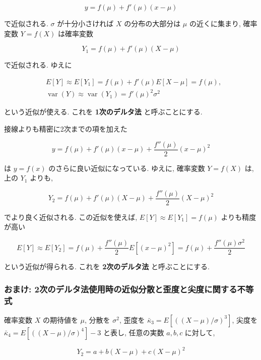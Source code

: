 \documentclass[
  letterpaper,
  DIV=11,
  numbers=noendperiod]{scrartcl}
\begin{document}
\[
y = f(\mu) + f'(\mu)(x - \mu)
\]

で近似される. \(\sigma\) が十分小さければ \(X\) の分布の大部分は \(\mu\)
の近くに集まり, 確率変数 \(Y = f(X)\) は確率変数

\[
Y_1 = f(\mu) + f'(\mu)(X - \mu)
\]

で近似される. ゆえに

\[
\begin{aligned}
&
E[Y] \approx E[Y_1] = f(\mu) + f'(\mu)E[X - \mu] = f(\mu),
\\ &
\operatorname{var}(Y) \approx \operatorname{var}(Y_1) = f'(\mu)^2\sigma^2
\end{aligned}
\]

という近似が使える. これを \textbf{1次のデルタ法} と呼ぶことにする.

接線よりも精密に2次までの項を加えた

\[
y = f(\mu) + f'(\mu)(x - \mu) + \frac{f''(\mu)}{2}(x - \mu)^2
\]

は \(y = f(x)\) のさらに良い近似になっている. ゆえに, 確率変数
\(Y=f(X)\) は, 上の \(Y_1\) よりも,

\[
Y_2 = f(\mu) + f'(\mu)(X - \mu) + \frac{f''(\mu)}{2}(X - \mu)^2
\]

でより良く近似される. この近似を使えば, \(E[Y]\approx E[Y_1] = f(\mu)\)
よりも精度が高い

\[
E[Y] \approx E[Y_2] = f(\mu) + \frac{f''(\mu)}{2}E[(x - \mu)^2] =
f(\mu) + \frac{f''(\mu)\sigma^2}{2}
\]

という近似が得られる. これを \textbf{2次のデルタ法} と呼ぶことにする.

\hypertarget{ux304aux307eux3051-2ux6b21ux306eux30c7ux30ebux30bfux6cd5ux4f7fux7528ux6642ux306eux8fd1ux4f3cux5206ux6563ux3068ux6b6aux5ea6ux3068ux5c16ux5ea6ux306bux95a2ux3059ux308bux4e0dux7b49ux5f0f}{%
\subsubsection{おまけ:
2次のデルタ法使用時の近似分散と歪度と尖度に関する不等式}\label{ux304aux307eux3051-2ux6b21ux306eux30c7ux30ebux30bfux6cd5ux4f7fux7528ux6642ux306eux8fd1ux4f3cux5206ux6563ux3068ux6b6aux5ea6ux3068ux5c16ux5ea6ux306bux95a2ux3059ux308bux4e0dux7b49ux5f0f}}

確率変数 \(X\) の期待値を \(\mu\), 分散を \(\sigma^2\), 歪度を
\(\bar\kappa_3=E[((X-\mu)/\sigma)^3]\), 尖度を
\(\bar\kappa_4=E[((X-\mu)/\sigma)^4]-3\) と表し, 任意の実数 \(a,b,c\)
に対して,

\[
Y_2 = a + b(X-\mu) + c(X-\mu)^2
\]
\end{document}
